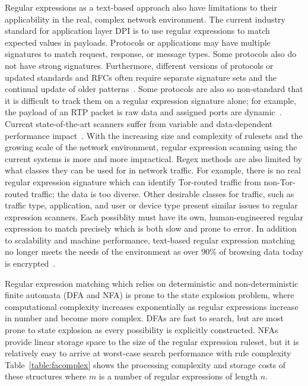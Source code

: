 Regular expressions as a text-based approach also have limitations to their applicability in the real, complex network environment. The current industry standard for application layer DPI is to use regular expressions to match expected values in payloads. Protocols or applications may have multiple signatures to match request, response, or message types. Some protocols also do not have strong signatures. Furthermore, different versions of protocols or updated standards and RFCs often require separate signature sets and the continual update of older patterns~\cite{rexactor}. Some protocols are also so non-standard that it is difficult to track them on a regular expression signature alone; for example, the payload of an RTP packet is raw data and assigned ports are dynamic~\cite{rfc3550}. Current state-of-the-art scanners suffer from variable and data-dependent performance impact~\cite{deepmatch}. With the increasing size and complexity of rulesets and the growing scale of the network environment, regular expression scanning using the current systems is more and more impractical. Regex methods are also limited by what classes they can be used for in network traffic. For example, there is no real regular expression signature which can identify Tor-routed traffic from non-Tor-routed traffic; the data is too diverse. Other desirable classes for traffic, such as traffic type, application, and user or device type present similar issues to regular expression scanners. Each possiblity must have its own, human-engineered regular expression to match precisely which is both slow and prone to error. In addition to scalability and machine performance, text-based regular expression matching no longer meets the needs of the environment as over 90\% of browsing data today is encrypted~\cite{google}.

Regular expression matching which relies on deterministic and non-deterministic finite automata (DFA and NFA) is prone to the state explosion problem, where computational complexity increases exponentially as regular expressions increase in number and  become more complex. DFAs are fast to search, but are most prone to state explosion as every possibility is explicitly constructed. NFAs provide linear storage space to the size of the regular expression ruleset, but it is relatively easy to arrive at worst-case search performance with rule complexity~\cite{alpinepalm} Table~\ref{table:facomplex} shows the processing complexity and storage costs of these structures where $m$ is a number of regular expressions of length $n$.

